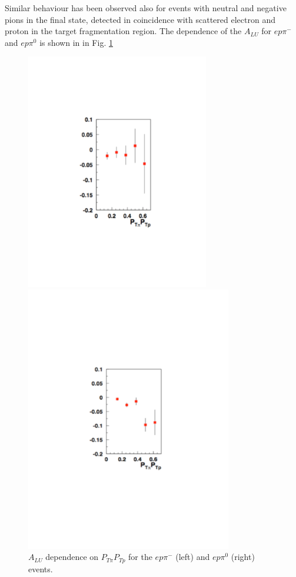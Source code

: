 \documentclass[11pt,a4paper]{article}
\begin{document}
Similar behaviour has been observed also for events with neutral and negative pions in the final state, detected in coincidence with
scattered electron and proton in the target fragmentation region.
The dependence of the $A_{LU}$ for $ep\pi^-$ and  $ep\pi^0$  is shown in
in Fig. \ref{fig:b2b-pionpt}

\begin{figure}
\begin{minipage}{.5\textwidth}
\includegraphics[width=8cm]{plots/b2b-pimpt.pdf}
\end{minipage}
\begin{minipage}{.5\textwidth}
\includegraphics[width=9cm]{plots/b2b-pi0pt.pdf}
\end{minipage}
   \caption{$A_{LU}$ dependence on $P_{T\pi}P_{Tp}$ for the  $ep\pi^-$  (left) and  $ep\pi^0$ (right) events.}
 \label{fig:b2b-pionpt}
 \end{figure} 
\end{document}

